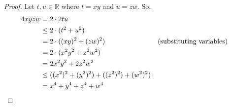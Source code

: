 \documentclass{article}
\begin{document}
\begin{proof}

    Let $t,u \in \mathbb{R}$ where $t=xy$ and $u=zw$. So,
    \begin{align*}
        4xyzw &= 2\cdot2tu \\
        &\le 2\cdot(t^2+u^2) \\
        &= 2\cdot((xy)^2+(zw)^2) &&\text{(substituting variables)} \\
        &= 2\cdot(x^2y^2+z^2w^2) \\ 
        &= 2x^2y^2+2z^2w^2 \\
        &\le ((x^2)^2+(y^2)^2)+((z^2)^2)+(w^2)^2) \\
        &= x^4+y^4+z^4+w^4 &&\qedhere
    \end{align*}
\end{proof}
\end{document}
